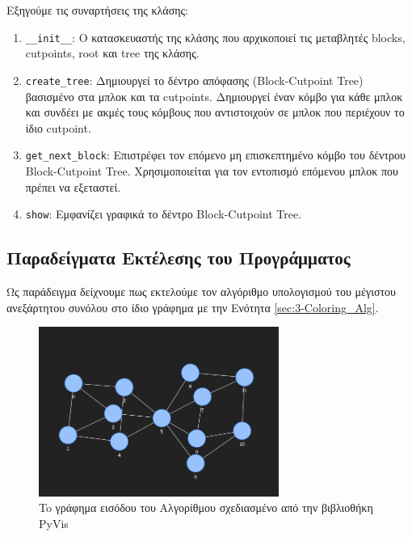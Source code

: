 Εξηγούμε τις συναρτήσεις της κλάσης:

\begin{enumerate}
	\item \texttt{\_\_init\_\_}: Ο κατασκευαστής της κλάσης που αρχικοποιεί τις μεταβλητές blocks, cutpoints, root και tree της κλάσης.
	
	\item \texttt{create\_tree}: Δημιουργεί το δέντρο απόφασης (Block-Cutpoint Tree) βασισμένο στα μπλοκ και τα cutpoints. Δημιουργεί έναν κόμβο για κάθε μπλοκ και συνδέει με ακμές τους κόμβους που αντιστοιχούν σε μπλοκ που περιέχουν το ίδιο cutpoint.
	
	\item \texttt{get\_next\_block}: Επιστρέφει τον επόμενο μη επισκεπτημένο κόμβο του δέντρου Block-Cutpoint Tree. Χρησιμοποιείται για τον εντοπισμό επόμενου μπλοκ που πρέπει να εξεταστεί.
	
	\item \texttt{show}: Εμφανίζει γραφικά το δέντρο Block-Cutpoint Tree.
\end{enumerate}


\subsection{Παραδείγματα Εκτέλεσης του Προγράμματος}

Ως παράδειγμα δείχνουμε πως εκτελούμε τον αλγόριθμο υπολογισμού του μέγιστου ανεξάρτητου συνόλου στο ίδιο γράφημα με την Ενότητα \ref{sec:3-Coloring_Alg}. 



\begin{figure}[H]
	\centering
	\includegraphics[width=0.7\textwidth]{pictures/coloring-1.png} 
	\caption{To γράφημα εισόδου του Αλγορίθμου σχεδιασμένο από την βιβλιοθήκη PyVis}
	\label{fig:at-free-graph-pyvis-3-colouring}
\end{figure}

